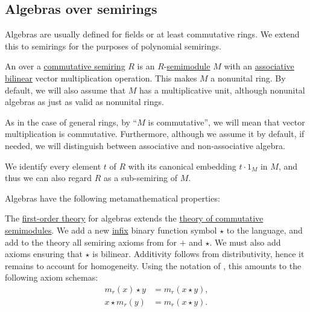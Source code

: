 \subsection{Algebras over semirings}\label{subsec:algebras_over_semirings}

Algebras are usually defined for fields or at least commutative rings. We extend this to semirings for the purposes of polynomial semirings.

\begin{definition}\label{def:algebra_over_semiring}\mimprovised
  An  over a \hyperref[def:semiring/commutative]{commutative semiring} \( R \) is an \( R \)-\hyperref[def:semimodule]{semimodule} \( M \) with an \hyperref[def:magma/associative]{associative} \hyperref[def:multilinear_function]{bilinear} vector multiplication operation. This makes \( M \) a nonunital ring. By default, we will also assume that \( M \) has a multiplicative unit, although nonunital algebras as just as valid as nonunital rings.

  As in the case of general rings, by \enquote{\( M \) is commutative}, we will mean that vector multiplication is commutative. Furthermore, although we assume it by default, if needed, we will distinguish between associative and non-associative algebra.

  We identify every element \( t \) of \( R \) with its canonical embedding \( t \cdot 1_M \) in \( M \), and thus we can also regard \( R \) as a sub-semiring of \( M \).

  Algebras have the following metamathematical properties:
  \begin{thmenum}
     The \hyperref[def:first_order_theory]{first-order theory} for algebras extends the \hyperref[def:semimodule/theory]{theory of commutative semimodules}. We add a new \hyperref[rem:first_order_formula_conventions/infix]{infix} binary function symbol \( \star \) to the language, and add to the theory all semiring axioms from  for \( + \) and \( \star \). We must also add axioms ensuring that \( \star \) is bilinear. Additivity follows from distributivity, hence it remains to account for homogeneity. Using the notation of , this amounts to the following axiom schemas:
    \begin{align*}
      m_r(x) \star y &= m_r(x \star y), \\
      x \star m_r(y) &= m_r(x \star y).
    \end{align*}


\end{thmenum}
\end{definition}
